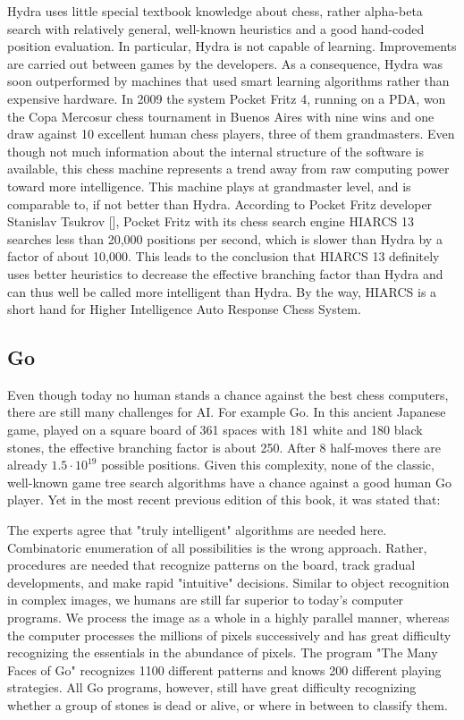 \documentclass[10pt]{book}
\begin{document}
Hydra uses little special textbook knowledge about chess, rather alpha-beta search with relatively general, well-known heuristics and a good hand-coded\\
position evaluation. In particular, Hydra is not capable of learning. Improvements are carried out between games by the developers. As a consequence, Hydra was soon outperformed by machines that used smart learning algorithms rather than expensive hardware.
In 2009 the system Pocket Fritz 4, running on a PDA, won the Copa Mercosur chess tournament in Buenos Aires with nine wins and one draw against 10 excellent human chess players, three of them grandmasters. Even though not much information about the internal structure of the software is available, this chess machine represents a trend away from raw computing power toward more intelligence. This machine plays at grandmaster level, and is comparable to, if not better than Hydra. According to Pocket Fritz developer Stanislav Tsukrov [\cite{wik13}], Pocket Fritz with its chess search engine HIARCS 13 searches less than 20,000 positions per second, which is slower than Hydra by a factor of about 10,000. This leads to the conclusion that HIARCS 13 definitely uses better heuristics to decrease the effective branching factor than Hydra and can thus well be called more intelligent than Hydra. By the way, HIARCS is a short hand for Higher Intelligence Auto Response Chess System.

\subsection{Go}
Even though today no human stands a chance against the best chess computers, there are still many challenges for AI. For example Go. In this ancient Japanese game, played on a square board of 361 spaces with 181 white and 180 black stones, the effective branching factor is about 250. After 8 half-moves there are already $1.5 \cdot 10^{19}$ possible positions. Given this complexity, none of the classic, well-known game tree search algorithms have a chance against a good human Go player. Yet in the most recent previous edition of this book, it was stated that:

\begin{displayquote}
The experts agree that "truly intelligent" algorithms are needed here. Combinatoric enumeration of all possibilities is the wrong approach. Rather, procedures are needed that recognize patterns on the board, track gradual developments, and make rapid "intuitive" decisions. Similar to object recognition in complex images, we humans are still far superior to today's computer programs. We process the image as a whole in a highly parallel manner, whereas the computer processes the millions of pixels successively and has great difficulty recognizing the essentials in the abundance of pixels. The program "The Many Faces of Go" recognizes 1100 different patterns and knows 200 different playing strategies. All Go programs, however, still have great difficulty recognizing whether a group of stones is dead or alive, or where in between to classify them.
\end{displayquote}
\end{document}
